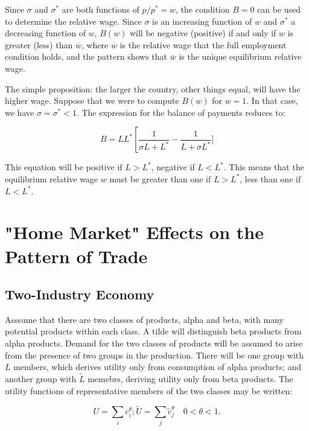 Since $\sigma$ and $\sigma^*$ are both functions of $p/p^* = w$, the condition $B = 0$ can be used to determine the relative wage. Since $\sigma$ is an increasing function of $w$ and $\sigma^*$ a decreasing function of $w$, $B(w)$ will be negative (positive) if and only if $w$ is greater (less) than $\overline{w}$, where $\overline{w}$ is the relative wage that the full employment condition holds, and the pattern shows that $\overline{w}$ is the unique equilibrium relative wage.

The simple proposition: the larger the country, other things equal, will have the higher wage. Suppose that we were to compute $B(w)$ for $w = 1$. In that case, we have $\sigma = \sigma^* < 1$. The expression for the balance of payments reduces to:

\begin{equation}
  B = LL^* \left[ \frac{1}{\sigma L + L^*} - \frac{1}{L + \sigma L^*}]
\end{equation}

This equation will be positive if $L > L^*$, negative if $L < L^*$. This means that the equilibrium relative wage $w$ must be greater than one if $L > L^*$, less than one if $L < L^*$.

\section{"Home Market" Effects on the Pattern of Trade}

\subsection{Two-Industry Economy}

Asssume that there are two classes of products, alpha and beta, with many potential products within each class. A tilde will distinguish beta products from alpha products. Demand for the two classes of products will be assumed to arise from the presence of two groups in the production. There will be one group with $L$ members, which derives utility only from consumption of alpha products; and another group with $\tilde{L}$ memebrs, deriving utility only from beta products. The utility functions of representative members of the two classes may be written:

\begin{equation}
  U = \sum_i c_i^{\theta}; \tilde{U} = \sum_j \tilde{c}_j^{\theta} \quad 0 < \theta < 1.
\end{equation}

